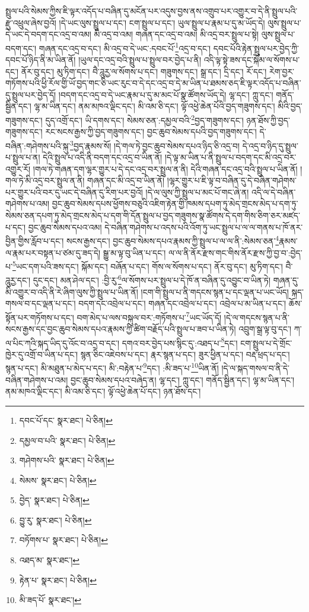 སྤྲུལ་པའི་སེམས་ཀྱིས་ཇི་ལྟར་འདོད་པ་བཞིན་དུ་མངོན་པར་འདུས་བྱས་ནས་འགྲུབ་པར་འགྱུར་བ་དེ་ནི་སྤྲུལ་པའི་རྫུ་འཕྲུལ་ཞེས་བྱའོ། །དེ་ཡང་ལུས་སྤྲུལ་པ་དང་། ངག་སྤྲུལ་པ་དང་། ཡུལ་སྤྲུལ་པ་རྣམ་པ་དུ་མ་ཡོད་དེ། ལུས་སྤྲུལ་པ་དེ་ཡང་དེ་བདག་དང་འདྲ་བ་འམ། མི་འདྲ་བ་འམ། གཞན་དང་འདྲ་བ་འམ། མི་འདྲ་བར་སྤྲུལ་པ་སྟེ། ལུས་སྤྲུལ་པ་བདག་དང་། གཞན་དང་འདྲ་བ་དང་། མི་འདྲ་བ་དེ་ཡང་:དབང་པོ་\footnote{དབང་པོ་དང་  སྣར་ཐང་།  པེ་ཅིན། }འདྲ་བ་དང་། དབང་པོའི་རྟེན་སྤྲུལ་པར་བྱེད་ཀྱི་དབང་པོ་ཉིད་ནི་མ་ཡིན་ནོ། །ཡུལ་དང་འདྲ་བའི་སྤྲུལ་པ་སྤྲུལ་བར་བྱེད་པ་ནི། འདི་ལྟ་སྟེ་ཟས་དང་སྐོམ་ལ་སོགས་པ་དང་། ནོར་བུ་དང་། མུ་ཏིག་དང་། བཻ་ཌཱུརྱ་ལ་སོགས་པ་དང་། གཟུགས་དང་། སྒྲ་དང་། དྲི་དང་། རོ་དང་། རེག་བྱར་གཏོགས་པའི་ཕྱི་རོལ་གྱི་ཡོ་བྱད་གང་ཅི་ཡང་རུང་བ་དེ་དང་འདྲ་བ་དེ་མ་ཡིན་པ་ཐམས་ཅད་ཇི་ལྟར་འདོད་པ་བཞིན་དུ་སྤྲུལ་པར་བྱེད་དོ། །བདག་དང་འདྲ་བ་དེ་ཡང་རྣམ་པ་དུ་མ་མང་པོ་སྣ་ཚོགས་ཡོད་དེ། ལྷ་དང་། ཀླུ་དང་། གནོད་སྦྱིན་དང་། ལྷ་མ་ཡིན་དང་། ནམ་མཁའ་ལྡིང་དང་། མི་འམ་ཅི་དང་། ལྟོ་འཕྱེ་ཆེན་པོའི་བྱད་གཟུགས་དང་། མིའི་བྱད་གཟུགས་དང་། དུད་འགྲོ་དང་། ཡི་དགས་དང་། སེམས་ཅན་:དམྱལ་བའི་\footnote{དམྱལ་བ་པའི་  སྣར་ཐང་།  པེ་ཅིན། }བྱད་གཟུགས་དང་། ཉན་ཐོས་ཀྱི་བྱད་གཟུགས་དང་། རང་སངས་རྒྱས་ཀྱི་བྱད་གཟུགས་དང་། བྱང་ཆུབ་སེམས་དཔའི་བྱད་གཟུགས་དང་། དེ་བཞིན་:གཤེགས་པའི་སྐུ་\footnote{གཤེགས་པའི་  སྣར་ཐང་།  པེ་ཅིན། }བྱད་རྣམས་སོ། །དེ་གལ་ཏེ་བྱང་ཆུབ་སེམས་དཔའ་ཉིད་ཅི་འདྲ་བ། དེ་འདྲ་བ་ཉིད་དུ་སྤྲུལ་པ་སྤྲུལ་པ་ན། དེའི་སྤྲུལ་པ་འདི་ནི་བདག་དང་འདྲ་བ་ཡིན་ནོ། །དེ་ལྟ་མ་ཡིན་པ་ནི་སྤྲུལ་པ་བདག་དང་མི་འདྲ་བར་འགྱུར་རོ། །གལ་ཏེ་གཞན་དག་ལྷར་གྱུར་པ་དེ་དང་འདྲ་བར་སྤྲུལ་ན་ནི། དེའི་གཞན་དང་འདྲ་བའི་སྤྲུལ་པ་ཡིན་ནོ། །གལ་ཏེ་མི་འདྲ་བར་སྤྲུལ་ན་ནི། གཞན་དང་མི་འདྲ་བ་ཡིན་ནོ། །ལྷར་གྱུར་པ་ཇི་ལྟ་བ་བཞིན་དུ་དེ་བཞིན་གཤེགས་པར་གྱུར་པའི་བར་དུ་ཡང་དེ་བཞིན་དུ་རིག་པར་བྱའོ། །དེ་ལ་ལུས་ཀྱི་སྤྲུལ་པ་མང་པོ་གང་ཞེ་ན། འདི་ལ་དེ་བཞིན་གཤེགས་པ་འམ། བྱང་ཆུབ་སེམས་དཔས་ཕྱོགས་བཅུའི་འཇིག་རྟེན་གྱི་ཁམས་དཔག་ཏུ་མེད་གྲངས་མེད་པ་དག་ཏུ་སེམས་ཅན་དཔག་ཏུ་མེད་གྲངས་མེད་པ་དག་གི་དོན་སྤྲུལ་པ་བྱད་གཟུགས་སྣ་ཚོགས་དེ་དག་གིས་ཅིག་ཅར་མཛད་པ་དང་། བྱང་ཆུབ་སེམས་དཔའ་འམ། དེ་བཞིན་གཤེགས་པ་འདས་པའི་འོག་ཏུ་ཡང་སྤྲུལ་པ་ལ་ལ་གནས་པ་ཁོ་ནར་བྱིན་གྱིས་རློབ་པ་དང་། སངས་རྒྱས་དང་། བྱང་ཆུབ་སེམས་དཔའ་རྣམས་ཀྱི་སྤྲུལ་པ་ལ་ལ་ནི་:སེམས་ཅན་\footnote{སེམས་  སྣར་ཐང་།  པེ་ཅིན། }རྣམས་ལ་རྣམ་པར་བསྟན་པ་ཙམ་དུ་ཟད་དེ། སྒྱུ་མ་ལྟ་བུ་ཡིན་པ་དང་། ལ་ལ་ནི་ནོར་རྫས་གང་གིས་ནོར་རྫས་ཀྱི་བྱ་བ་:བྱེད་པ་\footnote{བྱེད་  སྣར་ཐང་།  པེ་ཅིན། }ཡང་དག་པའི་ཟས་དང་། སྐོམ་དང་། བཞོན་པ་དང་། གོས་ལ་སོགས་པ་དང་། ནོར་བུ་དང་། མུ་ཏིག་དང་། བཻ་ཌཱུརྱ་དང་། དུང་དང་། མན་ཤེལ་དང་། :བྱི་རུ་\footnote{བྱུ་རུ་  སྣར་ཐང་།  པེ་ཅིན། }ལ་སོགས་པར་སྤྲུལ་པ་དེ་ཁོ་ན་བཞིན་དུ་འབྱུང་བ་ཡིན་ཏེ། གཞན་དུ་མི་འགྱུར་བ་འདི་ནི་རེ་ཞིག་ལུས་ཀྱི་སྤྲུལ་པ་ཡིན་ནོ། །ངག་གི་སྤྲུལ་པ་ནི་གདངས་སྙན་པ་དང་ལྡན་པ་ཡང་ཡོད། སྐད་གསལ་བ་དང་ལྡན་པ་དང་། བདག་དང་འབྲེལ་པ་དང་། གཞན་དང་འབྲེལ་པ་དང་། འབྲེལ་པ་མ་ཡིན་པ་དང་། ཆོས་སྟོན་པར་གཏོགས་པ་དང་། བག་མེད་པ་ལས་བསྐུལ་བར་:གཏོགས་པ་\footnote{བཏོགས་པ་  སྣར་ཐང་།  པེ་ཅིན། }ཡང་ཡོད་དོ། །དེ་ལ་གདངས་སྙན་པ་ནི་སངས་རྒྱས་དང་བྱང་ཆུབ་སེམས་དཔའ་རྣམས་ཀྱི་ཚིག་བརྗོད་པའི་སྤྲུལ་པ་ཟབ་པ་ཡིན་ཏེ། འབྲུག་སྒྲ་ལྟ་བུ་དང་། ཀ་ལ་པིང་ཀའི་སྐད་ཡིད་དུ་འོང་བ་འདྲ་བ་དང་། དགའ་བར་བྱེད་པས་སྙིང་དུ་:འཐད་པ་\footnote{འཐད་མ་  སྣར་ཐང་། }དང་། ངག་སྤྲུལ་པ་དེ་གྲོང་ཁྱེར་དུ་འགྲོ་བ་ཡིན་པ་དང་། སྙན་ཅིང་འཇེབས་པ་དང་། རྣར་སྙན་པ་དང་། ཟུར་ཕྱིན་པ་དང་། བརྡ་ཕྲད་པ་དང་། སྙན་པ་དང་། མི་མཐུན་པ་མེད་པ་དང་། མི་:བརྟེན་པ་\footnote{རྟེན་པ་  སྣར་ཐང་།  པེ་ཅིན། }དང་། :མི་ཟད་པ་\footnote{མི་ཟད་པོ་  སྣར་ཐང་། }ཡིན་ནོ། །དེ་ལ་སྐད་གསལ་བ་ནི་དེ་བཞིན་གཤེགས་པ་འམ། བྱང་ཆུབ་སེམས་དཔའ་བཞེད་ན། ལྷ་དང་། ཀླུ་དང་། གནོད་སྦྱིན་དང་། ལྷ་མ་ཡིན་དང་། ནམ་མཁའ་ལྡིང་དང་། མི་འམ་ཅི་དང་། ལྟོ་འཕྱེ་ཆེན་པོ་དང་། ཉན་ཐོས་དང་། 